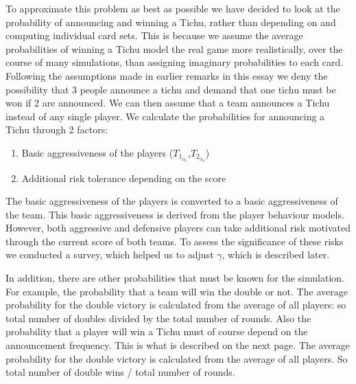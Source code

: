 To approximate this problem as best as possible we have decided to look at the probability of announcing and winning a Tichu, rather than depending on and computing individual card sets. This is because we assume the average probabilities of winning a Tichu model the real game more realistically, over the course of many simulations, than assigning imaginary probabilities to each card. Following the assumptions made in earlier remarks in this essay we deny the possibility that 3 people announce a tichu and demand that one tichu must be won if 2 are announced. We can then assume that a team announces a Tichu instead of any single player. We calculate the probabilities for announcing a Tichu through 2 factors:
\begin{enumerate}
\item Basic aggressiveness of the players ($T_{1_{\alpha_1}}$,$T_{2_{\alpha_2}}$)
\item  Additional risk tolerance depending on the score
\end{enumerate}
The basic aggressiveness of the players is converted to a basic aggressiveness of the team. This basic aggressiveness is derived from the player behaviour models. However, both aggressive and defensive players can take additional risk motivated through the current score of both teams. To assess the significance of these risks we conducted a survey, which helped us to adjust $\gamma$, which is described later.

In addition, there are other probabilities that must be known for the simulation. For example, the probability that a team will win the double or not. The average probability for the double victory is calculated from the average of all players: so total number of doubles divided by the total number of rounds. Also the probability that a player will win a Tichu must of course depend on the announcement frequency. This is what is described on the next page.
The average probability for the double victory is calculated from the average of all players. So total number of double wins / total number of rounds.

